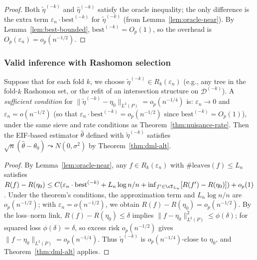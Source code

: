 \documentclass[12pt]{article}
\begin{document}
\begin{proof}
Both $\tilde{\eta}^{(-k)}$ and $\hat\eta^{(-k)}$ satisfy the oracle inequality; the only difference is the extra term $\varepsilon_n \cdot \text{best}^{(-k)}$ for $\tilde{\eta}^{(-k)}$ (from Lemma~\ref{lem:oracle-near}). By Lemma~\ref{lem:best-bounded}, $\text{best}^{(-k)} = O_p(1)$, so the overhead is $O_p(\varepsilon_n) = o_p(n^{-1/2})$.
\end{proof}

\subsubsection{Valid inference with Rashomon selection}

\begin{proposition}
\label{prop:rashomon-dml}
Suppose that for each fold $k$, we choose $\tilde{\eta}^{(-k)} \in R_k(\varepsilon_n)$ (e.g., any tree in the fold-$k$ Rashomon set, or the refit of an intersection structure on $\mathcal{D}^{(-k)}$). A \emph{sufficient condition} for $\|\tilde{\eta}^{(-k)} - \eta_0\|_{L^2(P)} = o_p(n^{-1/4})$ is: $\varepsilon_n \to 0$ and $\varepsilon_n = o(n^{-1/2})$ (so that $\varepsilon_n \cdot \text{best}^{(-k)} = o_p(n^{-1/2})$ since $\text{best}^{(-k)} = O_p(1)$), under the same sieve and rate conditions as Theorem~\ref{thm:nuisance-rate}. Then the EIF-based estimator $\hat\theta$ defined with $\tilde{\eta}^{(-k)}$ satisfies $\sqrt{n}(\hat\theta - \theta_0) \leadsto N(0, \sigma^2)$ by Theorem~\ref{thm:dml-alt}.
\end{proposition}
\begin{proof}
By Lemma~\ref{lem:oracle-near}, any $f \in R_k(\varepsilon_n)$ with $\#\text{leaves}(f) \le L_n$ satisfies $R(f) - R(\eta_0) \le C( \varepsilon_n \cdot \text{best}^{(-k)} + L_n \log n / n + \inf_{f' \in \cT_{L_n}}[R(f') - R(\eta_0)] ) + o_p(1)$. Under the theorem's conditions, the approximation term and $L_n \log n / n$ are $o_p(n^{-1/2})$; with $\varepsilon_n = o(n^{-1/2})$, we obtain $R(f) - R(\eta_0) = o_p(n^{-1/2})$. By the loss--norm link, $R(f) - R(\eta_0) \le \delta$ implies $\|f - \eta_0\|_{L^2(P)}^2 \le \phi(\delta)$; for squared loss $\phi(\delta) = \delta$, so excess risk $o_p(n^{-1/2})$ gives $\|f - \eta_0\|_{L^2(P)} = o_p(n^{-1/4})$. Thus $\tilde{\eta}^{(-k)}$ is $o_p(n^{-1/4})$-close to $\eta_0$, and Theorem~\ref{thm:dml-alt} applies.
\end{proof}


\end{document}
